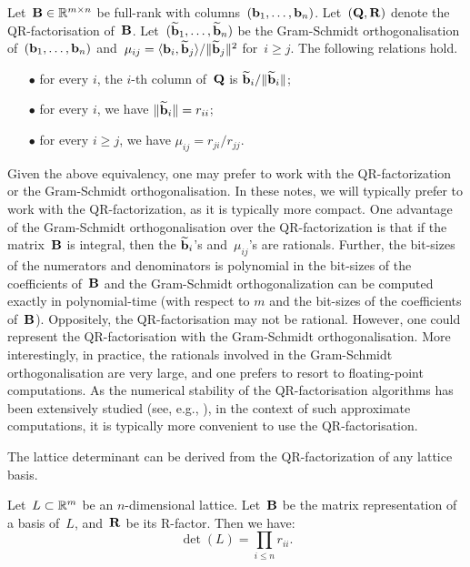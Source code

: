 \begin{lemma}
Let~${\bf B} \in \mathbb{R}^{m \times n}$ be full-rank with columns~$({\bf b}_1,\ldots, {\bf b}_n)$. Let~$({\bf Q}, {\bf R})$ denote the QR-factorisation of~${\bf B}$.  Let~$(\widetilde{{\bf b}}_1, \ldots, \widetilde{{\bf b}}_n)$ be the Gram-Schmidt orthogonalisation of~$({\bf b}_1,\ldots, {\bf b}_n)$ and~$\mu_{ij} =  \langle{\bf b}_i,\widetilde{{\bf b}}_j\rangle / \|\widetilde{{\bf b}}_j\|^2$ for~$i \geq j$. The following relations hold.
\begin{itemize}
\item[$\bullet$] for every $i$, the $i$-th column of~${\bf Q}$ is $\widetilde{{\bf b}}_i / \|\widetilde{{\bf b}}_i\|$;
\item[$\bullet$] for every $i$, we have $\|\widetilde{{\bf b}}_i\| = r_{ii}$;
\item[$\bullet$] for every $i \geq j$, we have $\mu_{ij} = r_{ji}/r_{jj}$.
\end{itemize}
\end{lemma} 
 
Given the above equivalency, one may prefer to work with the QR-factorization or the Gram-Schmidt orthogonalisation. 
In these notes, we will typically prefer to work with the QR-factorization, as it is typically more compact. One advantage of the 
Gram-Schmidt orthogonalisation over the QR-factorization is that if the matrix~${\bf B}$ is integral, then the $\widetilde{{\bf b}}_i$'s 
and~$\mu_{ij}$'s are rationals. Further, the bit-sizes of the numerators and denominators is polynomial in the bit-sizes of the 
coefficients of~${\bf B}$ and the Gram-Schmidt orthogonalization can be computed exactly in polynomial-time 
(with respect to $m$ and  the bit-sizes of the coefficients of~${\bf B}$). Oppositely, the QR-factorisation may not be rational. 
However, one could represent the QR-factorisation with the Gram-Schmidt orthogonalisation. More interestingly, in practice, the 
rationals involved in the Gram-Schmidt orthogonalisation are very large, and one prefers to resort to floating-point computations. 
As the numerical stability of the QR-factorisation algorithms has been extensively studied (see, e.g., \cite{Higham02}), in the context 
of such approximate computations, it is typically more convenient to use the QR-factorisation. 

The lattice determinant can be derived from the QR-factorization of any lattice basis. 

\begin{lemma}
\label{le:Rdet}
Let~$L \subset \mathbb{R}^m$ be an $n$-dimensional lattice. Let~${\bf B}$ be the matrix representation of a basis of~$L$, and~${\bf R}$ 
be its R-factor. Then we have:
\[\det(L) = \prod_{i \leq n} r_{ii}.\]
\end{lemma} 

